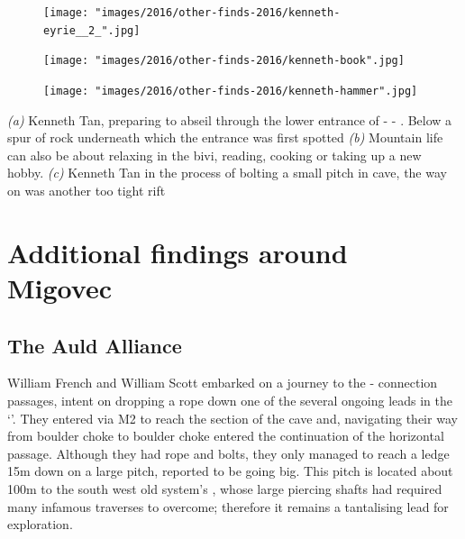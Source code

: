 \begin{pagefigure}
\checkoddpage \ifoddpage \forcerectofloat \else \forceversofloat \fi
\centering

    \begin{subfigure}[t]{0.5435\textwidth}
        \centering
        \texttt{[image: "images/2016/other-finds-2016/kenneth-eyrie\_\_2\_".jpg]} 
        \caption{} \label{moon door}
    \end{subfigure}
        \hfill
\begin{subfigure}[t]{0.4465\textwidth}
\centering
\texttt{[image: "images/2016/other-finds-2016/kenneth-book".jpg]}
 \caption{}\label{reading in the bivi}
\end{subfigure}
    \vspace{0cm}
    \begin{subfigure}[t]{\textwidth}
    \centering
        \texttt{[image: "images/2016/other-finds-2016/kenneth-hammer".jpg]} 
        \caption{} \label{hammer in B9}
    \end{subfigure}
    \caption{
    \emph{(a)}  Kenneth Tan, preparing to abseil through the lower entrance of \protect{} - \protect{} - \protect{}. Below a spur of rock underneath which the \protect{} entrance was first spotted 
     \emph{(b)} Mountain life can also be about relaxing in the bivi, reading, cooking or taking up a new hobby.
     \emph{(c)}  Kenneth Tan in the process of bolting a small pitch in \protect{} cave, the way on was another too tight rift }
\end{pagefigure}
\clearpage

\section{Additional findings around Migovec}

\subsection{The Auld Alliance}
William French and William Scott embarked on a journey to the - connection passages, intent on dropping a rope down one of the several ongoing leads in the `'. They entered via M2 to reach the  section of the cave and, navigating their way from boulder choke to boulder choke entered the continuation of the horizontal passage. Although they had rope and bolts, they only managed to reach a ledge 15m down on a large pitch, reported to be going big. This pitch is located  about 100m to the south west old system's , whose large piercing shafts had required many infamous traverses to overcome; therefore it remains a tantalising lead for exploration.





